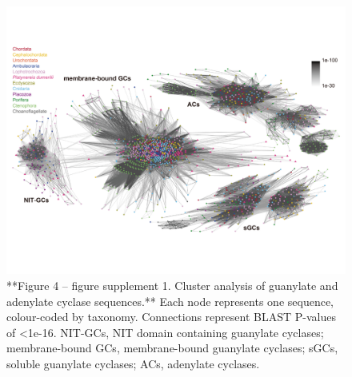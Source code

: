 \documentclass[
  10pt,
  onecolumn]{article}
\begin{document}
\begin{figure}
\includegraphics[width=33.33in]{figures/Fig4_sup1} \caption{**Figure 4 -- figure supplement 1. Cluster analysis of guanylate and adenylate cyclase sequences.** Each node represents one sequence, colour-coded by taxonomy. Connections represent BLAST P-values of <1e-16. NIT-GCs, NIT domain containing guanylate cyclases; membrane-bound GCs, membrane-bound guanylate cyclases; sGCs, soluble guanylate cyclases; ACs, adenylate cyclases.}\label{fig:unnamed-chunk-13}
\end{figure}
\end{document}
